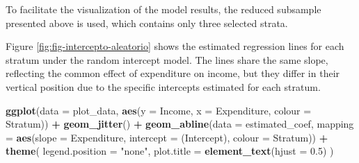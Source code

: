 \documentclass[
  english,
  12pt,
]{book}
\newenvironment{Shaded}{\begin{snugshade}}{\end{snugshade}}
\newcommand{\AttributeTok}[1]{\textcolor[rgb]{0.13,0.29,0.53}{#1}}
\newcommand{\FloatTok}[1]{\textcolor[rgb]{0.00,0.00,0.81}{#1}}
\newcommand{\FunctionTok}[1]{\textcolor[rgb]{0.13,0.29,0.53}{\textbf{#1}}}
\newcommand{\NormalTok}[1]{#1}
\newcommand{\OtherTok}[1]{\textcolor[rgb]{0.56,0.35,0.01}{#1}}
\newcommand{\SpecialCharTok}[1]{\textcolor[rgb]{0.81,0.36,0.00}{\textbf{#1}}}
\newcommand{\StringTok}[1]{\textcolor[rgb]{0.31,0.60,0.02}{#1}}
\begin{document}
To facilitate the visualization of the model results, the reduced subsample presented above is used, which contains only three selected strata.

\begin{Shaded}
\end{Shaded}

Figure \ref{fig:fig-intercepto-aleatorio} shows the estimated regression lines for each stratum under the random intercept model. The lines share the same slope, reflecting the common effect of expenditure on income, but they differ in their vertical position due to the specific intercepts estimated for each stratum.

\begin{Shaded}
\begin{Highlighting}[]
\FunctionTok{ggplot}\NormalTok{(}\AttributeTok{data =}\NormalTok{ plot\_data,}
       \FunctionTok{aes}\NormalTok{(}\AttributeTok{y =}\NormalTok{ Income, }\AttributeTok{x =}\NormalTok{ Expenditure, }\AttributeTok{colour =}\NormalTok{ Stratum)) }\SpecialCharTok{+}
  \FunctionTok{geom\_jitter}\NormalTok{() }\SpecialCharTok{+}
  \FunctionTok{geom\_abline}\NormalTok{(}\AttributeTok{data =}\NormalTok{ estimated\_coef,}
              \AttributeTok{mapping =} \FunctionTok{aes}\NormalTok{(}\AttributeTok{slope =}\NormalTok{ Expenditure,}
                            \AttributeTok{intercept =} \StringTok{\textasciigrave{}}\AttributeTok{(Intercept)}\StringTok{\textasciigrave{}}\NormalTok{,}
                            \AttributeTok{colour =}\NormalTok{ Stratum)) }\SpecialCharTok{+}
  \FunctionTok{theme}\NormalTok{(}
    \AttributeTok{legend.position =} \StringTok{"none"}\NormalTok{,}
    \AttributeTok{plot.title =} \FunctionTok{element\_text}\NormalTok{(}\AttributeTok{hjust =} \FloatTok{0.5}\NormalTok{)}
\NormalTok{  )}
\end{Highlighting}
\end{Shaded}
\end{document}
